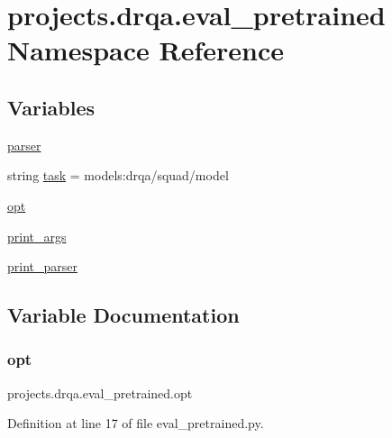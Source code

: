 \hypertarget{namespaceprojects_1_1drqa_1_1eval__pretrained}{}\section{projects.\+drqa.\+eval\+\_\+pretrained Namespace Reference}
\label{namespaceprojects_1_1drqa_1_1eval__pretrained}
\subsection*{Variables}
\begin{DoxyCompactItemize}
\item 
\hyperlink{namespaceprojects_1_1drqa_1_1eval__pretrained_a37675240be4a773ee4829182e7c26f74}{parser}
\item 
string \hyperlink{namespaceprojects_1_1drqa_1_1eval__pretrained_a1a4525d006d3214f0f4456bdbe36770c}{task} = \textquotesingle{}models\+:drqa/squad/model\textquotesingle{}
\item 
\hyperlink{namespaceprojects_1_1drqa_1_1eval__pretrained_ae8d8e4f7e660780380ee0e5c3b73c02a}{opt}
\item 
\hyperlink{namespaceprojects_1_1drqa_1_1eval__pretrained_a8530e9ddfd2e23f7f9d70864fd1b6c2c}{print\+\_\+args}
\item 
\hyperlink{namespaceprojects_1_1drqa_1_1eval__pretrained_a3d2f1d2e6627a7c2e64a604ee822cb27}{print\+\_\+parser}
\end{DoxyCompactItemize}


\subsection{Variable Documentation}
\mbox{\label{namespaceprojects_1_1drqa_1_1eval__pretrained_ae8d8e4f7e660780380ee0e5c3b73c02a}} 
\subsubsection{\texorpdfstring{opt}{opt}}
{\footnotesize\ttfamily projects.\+drqa.\+eval\+\_\+pretrained.\+opt}



Definition at line 17 of file eval\+\_\+pretrained.\+py.

